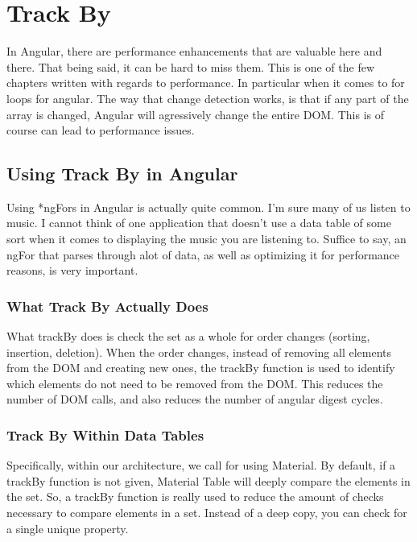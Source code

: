 \section{ Track By }
\maketitle{}

In Angular, there are performance enhancements that are valuable here and there.
That being said, it can be hard to miss them. This is one of the few chapters
written with regards to performance. In particular when it comes to for loops
for angular. The way that change detection works, is that if any part of the
array is changed, Angular will agressively change the entire DOM. This is of
course can lead to performance issues.

\subsection{ Using Track By in Angular }
Using *ngFors in Angular is actually quite common. I'm sure many of us listen
to music. I cannot think of one application that doesn't use a data table of
some sort when it comes to displaying the music you are listening to. Suffice
to say, an ngFor that parses through alot of data, as well as optimizing it for
performance reasons, is very important.

\subsubsection{ What Track By Actually Does }

What trackBy does is check the set as a whole for order changes (sorting,
insertion, deletion). When the order changes, instead of removing all elements
from the DOM and creating new ones, the trackBy function is used to identify
which elements do not need to be removed from the DOM. This reduces the number
of DOM calls, and also reduces the number of angular digest cycles.


\subsubsection{ Track By Within Data Tables }
Specifically, within our architecture, we call for using Material. By default,
if a trackBy function is not given, Material Table will deeply compare the
elements in the set. So, a trackBy function is really used to reduce the amount
of checks necessary to compare elements in a set. Instead of a deep copy, you
can check for a single unique property.

